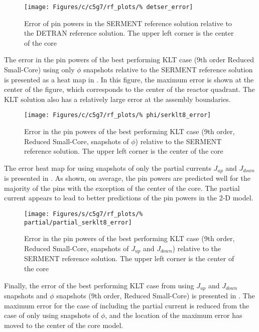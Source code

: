\begin{figure*}[tb]
    \centering
    \texttt{[image: Figures/c/c5g7/rf\_plots/\%
        detser\_error]}
    \caption{Error of pin powers in the SERMENT reference solution 
relative to the DETRAN reference solution.  The 
upper left corner is the center of the core}
    \label{fig:detser}
\end{figure*}

The error in the pin powers of the best performing KLT case (9th order 
Reduced Small-Core) using only $\phi$ snapshots relative to the SERMENT 
reference solution is presented as a heat map in .  In this 
figure, the maximum error is shown at the center of the figure, which 
corresponds to the center of the reactor quadrant.  The KLT solution also has a 
relatively large error at the assembly boundaries.

\begin{figure*}[tb]
    \centering
    \texttt{[image: Figures/c/c5g7/rf\_plots/\%
                          phi/serklt8\_error]}
    \caption{Error in the pin powers of the best performing KLT case (9th 
order, Reduced Small-Core, snapshots of $\phi$) relative to the SERMENT 
reference solution.  The upper left corner is the center of the core}
    \label{fig:serklt}
\end{figure*}

The error heat map for using snapshots of only the partial currents $J_{up}$ and 
$J_{down}$ is presented in .  As shown, on average, the pin 
powers are predicted well for the majority of the pins with the exception of 
the center of the core.  The partial current appears to lead to better 
predictions of the pin powers in the 2-D model.

\begin{figure*}[tb]
    \centering
    \texttt{[image: Figures/s/c5g7/rf\_plots/\%
                          partial/partial\_serklt8\_error]}
    \caption{Error in the pin powers of the best performing KLT case (9th 
order, Reduced Small-Core, snapshots of $J_{up}$ and $J_{down}$) 
relative to the 
SERMENT reference solution.  The upper left corner is the center of the 
core}
    \label{fig:serkltpl}
\end{figure*}

Finally, the error of the best performing KLT case from using $J_{up}$ and $J_{down}$ snapshots 
and $\phi$ snapshots (9th order, Reduced Small-Core) is presented in 
.  The maximum error for the case of including the 
partial current is reduced from the case of only using snapshots of $\phi$, and the location of the 
maximum error has moved to the center of the core model.

